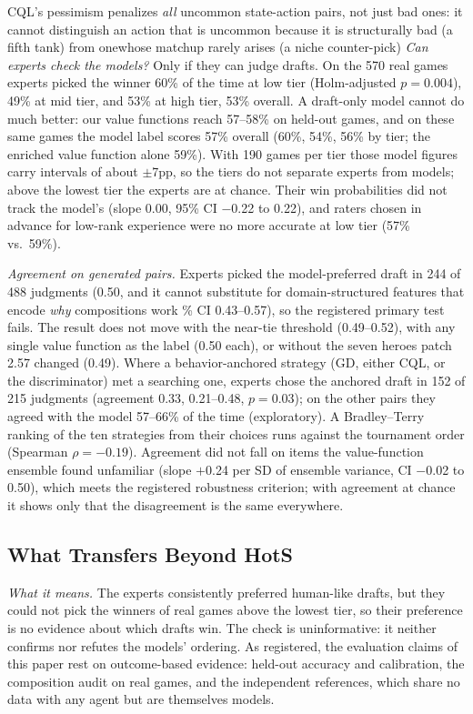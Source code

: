 \documentclass[journal]{IEEEtran}
\providecommand{\DIFaddtex}[1]{{\protect\color{blue} \sf #1}} %
\providecommand{\DIFdeltex}[1]{{\protect\color{red} \scriptsize #1}} %
\providecommand{\DIFaddbegin}{} %
\providecommand{\DIFaddend}{} %
\providecommand{\DIFdelbegin}{} %
\providecommand{\DIFdelend}{} %
\providecommand{\DIFadd}[1]{\texorpdfstring{\DIFaddtex{#1}}{#1}} %
\providecommand{\DIFdel}[1]{\texorpdfstring{\DIFdeltex{#1}}{}} %
\begin{document}
\DIFdelbegin \DIFdel{CQL's pessimism penalizes \textit{all} uncommon state-action pairs, not just bad ones: it cannot distinguish an action that is uncommon because it is structurally bad (a fifth tank) from onewhose matchup rarely arises (a niche counter-pick)}\DIFdelend \DIFaddbegin \DIFadd{\textit{Can experts check the models?} Only if they can judge drafts. On the 570 real games experts picked the winner 60\% of the time at low tier (Holm-adjusted $p = 0.004$), 49\% at mid tier, and 53\% at high tier, 53\% overall. A draft-only model cannot do much better: our value functions reach 57--58\% on held-out games, and on these same games the model label scores 57\% overall (60\%, 54\%, 56\% by tier; the enriched value function alone 59\%). With 190 games per tier those model figures carry intervals of about $\pm$7pp, so the tiers do not separate experts from models; above the lowest tier the experts are at chance. Their win probabilities did not track the model's (slope 0.00, 95\% CI $-$0.22 to 0.22), and raters chosen in advance for low-rank experience were no more accurate at low tier (57\% vs.\ 59\%).
}

\DIFadd{\textit{Agreement on generated pairs.} Experts picked the model-preferred draft in 244 of 488 judgments (0.50}\DIFaddend , \DIFdelbegin \DIFdel{and it cannot substitute for domain-structured features that encode \textit{why} compositions work}\DIFdelend \DIFaddbegin \DIFadd{95\% CI 0.43--0.57), so the registered primary test fails. The result does not move with the near-tie threshold (0.49--0.52), with any single value function as the label (0.50 each), or without the seven heroes patch 2.57 changed (0.49). Where a behavior-anchored strategy (GD, either CQL, or the discriminator) met a searching one, experts chose the anchored draft in 152 of 215 judgments (agreement 0.33, 0.21--0.48, $p = 0.03$); on the other pairs they agreed with the model 57--66\% of the time (exploratory). A Bradley--Terry ranking of the ten strategies from their choices runs against the tournament order (Spearman $\rho = -0.19$). Agreement did not fall on items the value-function ensemble found unfamiliar (slope $+$0.24 per SD of ensemble variance, CI $-$0.02 to 0.50), which meets the registered robustness criterion; with agreement at chance it shows only that the disagreement is the same everywhere}\DIFaddend .

\DIFdelbegin \subsection{\DIFdel{What Transfers Beyond HotS}}
\addtocounter{subsection}{-1}%
\DIFdelend \DIFaddbegin \DIFadd{\textit{What it means.} The experts consistently preferred human-like drafts, but they could not pick the winners of real games above the lowest tier, so their preference is no evidence about which drafts win. The check is uninformative: it neither confirms nor refutes the models' ordering. As registered, the evaluation claims of this paper rest on outcome-based evidence: held-out accuracy and calibration, the composition audit on real games, and the independent references, which share no data with any agent but are themselves models.
}\DIFaddend 
\end{document}

